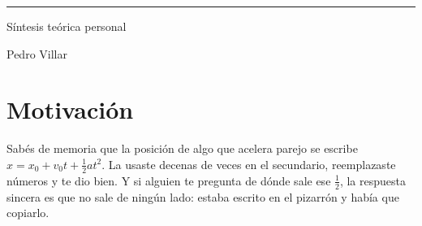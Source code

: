 \documentclass[11pt,openany]{book}
\newcommand{\sen}{\operatorname{sen}}
\renewcommand{\miNombre}{Pedro Villar}
\begin{document}
\begin{titlepage}
  \centering
  \vspace*{4cm}
  {\fontsize{22}{26}\selectfont\bfseries\color{textgray} \materiaActual \par}
  \vspace{0.5cm}
  {\large\color{rulegray}\rule{0.85\linewidth}{0.4pt}\par}
  \vspace{1cm}
  {\large\color{textgray} Síntesis teórica personal \par}
  \vspace{0.3cm}
  {\normalsize\color{rulegray} \miNombre \par}
\end{titlepage}

\tableofcontents

%
%
%
%
%


\section{Motivación}

\begin{motivacion}
Sabés de memoria que la posición de algo que acelera parejo se escribe $x = x_0 + v_0 t + \tfrac12 a t^2$. La usaste decenas de veces en el secundario, reemplazaste números y te dio bien. Y si alguien te pregunta de dónde sale ese $\tfrac12$, la respuesta sincera es que no sale de ningún lado: estaba escrito en el pizarrón y había que copiarlo.
\end{motivacion}
\end{document}
